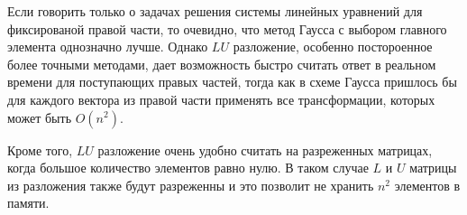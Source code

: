 \documentclass[11pt,a4paper,oneside]{article}
\begin{document}
Если говорить только о задачах решения системы линейных уравнений для фиксированой правой части, то очевидно, что метод Гаусса с выбором главного элемента однозначно лучше. Однако $LU$ разложение, особенно постороенное более точными методами, дает возможность быстро считать ответ в реальном времени для поступающих правых частей, тогда как в схеме Гаусса пришлось бы для каждого вектора из правой части применять все трансформации, которых может быть $O(n^2)$.

Кроме того, $LU$ разложение очень удобно считать на разреженных матрицах, когда большое количество элементов равно нулю. В таком случае $L$ и $U$ матрицы из разложения также будут разреженны и это позволит не хранить $n^2$ элементов в памяти.
\end{document}
